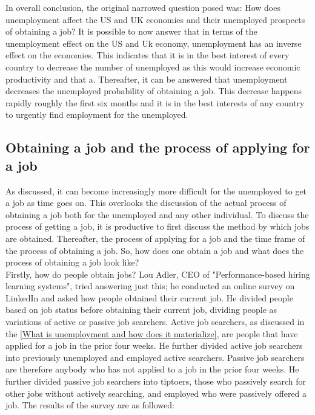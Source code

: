 In overall conclusion, the original narrowed question posed was:
How does unemployment affect the US and UK economies and their unemployed prospects of obtaining a job?
It is possible to now answer that in terms of the unemployment effect on the US and Uk economy, unemployment has an inverse effect on the economies.
This indicates that it is in the best interest of every country to decrease the number of unemployed as this would increase economic productivity and that a.
Thereafter, it can be answered that unemployment decreases the unemployed probability of obtaining a job.
This decrease happens rapidly roughly the first six months and it is in the best interests of any country to urgently find employment for the unemployed. \\

\subsection{Obtaining a job and the process of applying for a job} \label{Obtaining a job and the process of applying for a job}
As discussed, it can become increasingly more difficult for the unemployed to get a job as time goes on.
This overlooks the discussion of the actual process of obtaining a job both for the unemployed and any other individual.
To discuss the process of getting a job, it is productive to first discuss the method by which jobs are obtained.
Thereafter, the process of applying for a job and the time frame of the process of obtaining a job.
So, how does one obtain a job and what does the process of obtaining a job look like? \\

Firstly, how do people obtain jobs?
Lou Adler, CEO of "Performance-based hiring learning systems", tried answering just this; he conducted an online survey on LinkedIn and asked how people obtained their current job.
He divided people based on job status before obtaining their current job, dividing people as variations of active or passive job searchers.
Active job searchers, as discussed in the \ref{What is unemployment and how does it materialize}, are people that have applied for a job in the prior four weeks.
He further divided active job searchers into previously unemployed and employed active searchers.
Passive job searchers are therefore anybody who has not applied to a job in the prior four weeks.
He further divided passive job searchers into tiptoers, those who passively search for other jobs without actively searching, and employed who were passively offered a job.
The results of the survey are as followed: \\

